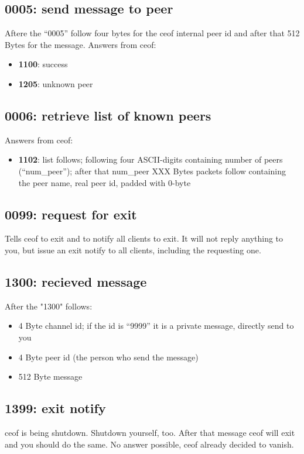 \documentclass[12pt,a4paper]{article}
\begin{document}
\subsection{0005: send message to peer}
Aftere the "`0005"' follow four bytes for the ceof internal peer
id and after that 512 Bytes for the message.
Answers from ceof:
\begin{itemize}
\item \textbf{1100}: success
\item \textbf{1205}: unknown peer
\end{itemize}
\subsection{0006: retrieve list of known peers}
Answers from ceof:
\begin{itemize}
\item \textbf{1102}: list follows; following four ASCII-digits containing number
of peers ("`num\_peer"'); after that  num\_peer
XXX Bytes packets follow containing the peer name, real peer id, padded with 0-byte
\end{itemize}
\subsection{0099: request for exit}
Tells ceof to exit and to notify all clients to exit. It will not reply anything to you, but issue an exit notify to all clients, including the requesting one.
\subsection{1300: recieved message}
After the "1300" follows:
\begin{itemize}
\item 4 Byte channel id; if the id is "`9999"' it is a private message, directly send to you
\item 4 Byte peer id (the person who send the message)
\item 512 Byte message
\end{itemize}
\subsection{1399: exit notify}
ceof is being shutdown.
Shutdown yourself, too.
After that message ceof will exit and you should do the same.
No answer possible, ceof already decided to vanish.
\end{document}

